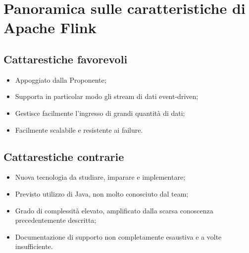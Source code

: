 \documentclass[8pt]{article}
\begin{document}
\section{Panoramica sulle caratteristiche di Apache Flink}
\subsection{Cattarestiche favorevoli}
\begin{itemize}
\setlength\itemsep{0em}
	\item Appoggiato dalla Proponente;
	\item Supporta in particolar modo gli stream di dati event-driven; 
	\item Gestisce facilmente l'ingresso di grandi quantità di dati;
	\item Facilmente scalabile e resistente ai failure.
\end{itemize}

\subsection{Cattarestiche contrarie}
\begin{itemize}
\setlength\itemsep{0em}
	\item Nuova tecnologia da studiare, imparare e implementare;
	\item Previsto utilizzo di Java, non molto conosciuto dal team;
	\item Grado di complessità elevato, amplificato dalla scarsa conoscenza precedentemente descritta;
	\item Documentazione di supporto non completamente esaustiva e a volte insufficiente.
\end{itemize}
\end{document}
